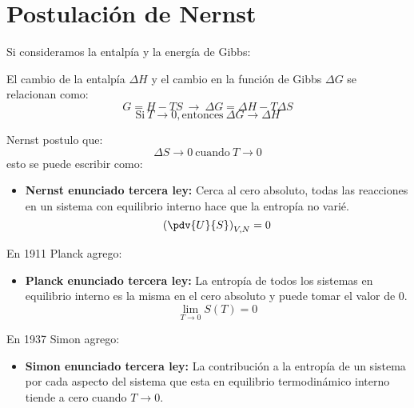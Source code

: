 \documentclass[../main]{subfiles}
\begin{document}
\section{Postulación de Nernst}
Si consideramos la entalpía y la energía de Gibbs:
\begin{center}
    El cambio de la entalpía $\Delta H$ y el cambio en la función de Gibbs $\Delta G$ se relacionan como:
    \begin{equation}
        G=H-TS \ \rightarrow \ \Delta G=\Delta H-T \Delta S
    \end{equation}
    \begin{equation}
        \text{Si} \ T \rightarrow 0, \text{entonces} \ \Delta G \rightarrow \Delta H
    \end{equation}
\end{center}
Nernst postulo que:
\begin{equation}
    \Delta S \rightarrow 0 \ \text{cuando} \ T \rightarrow 0
\end{equation}
esto se puede escribir como:
\begin{itemize}
    \item \textbf{Nernst enunciado tercera ley:} Cerca al cero absoluto, todas las reacciones en un sistema con equilibrio interno hace que la entropía no varié.
          \begin{equation}
              \left( \pdv{U}{S}\right)_{V,N}=0
          \end{equation}
\end{itemize}
En 1911 Planck agrego:
\begin{itemize}
    \item \textbf{Planck enunciado tercera ley:} La entropía de todos los sistemas en equilibrio interno es la misma en el cero absoluto y puede tomar el valor de 0.
          \begin{equation}
              \lim_{T \rightarrow 0} S(T)=0
          \end{equation}
\end{itemize}
En 1937 Simon agrego:
\begin{itemize}
    \item \textbf{Simon enunciado tercera ley:} La contribución a la entropía de un sistema por cada aspecto del sistema que esta en equilibrio termodinámico interno tiende a cero cuando $T\rightarrow 0$.
\end{itemize}
\end{document}
